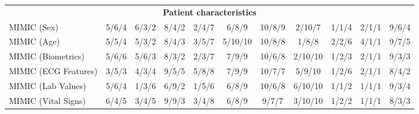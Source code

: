 \documentclass{article}
\begin{document}
\begin{table}[htbp]
\begin{tabular}{lcccccccccc}
                    \multicolumn{11}{c}{\textbf{Patient characteristics }} \\
                    MIMIC (Sex) & 5/6/4 & 6/3/2  & 8/4/2  & 2/4/7  & 6/8/9  & 10/8/9  & 2/10/7  & 1/1/4  & 2/1/1  & 9/6/4  \\
                    MIMIC (Age) & 5/5/4 & 5/3/2  & 8/4/3  & 3/5/7  & 5/10/10  & 10/8/8  & 1/8/8  & 2/2/6  & 4/1/1  & 9/7/5  \\
                    MIMIC (Biometrics) & 5/6/6 & 5/6/3  & 8/3/2  & 2/3/7  & 7/9/9  & 10/6/8  & 2/10/10  & 1/2/3  & 2/1/1  & 9/3/3 \\
                    MIMIC (ECG Features) & 3/5/3 & 4/3/4  & 9/5/5  & 5/8/8  & 7/9/9  & 10/7/7  & 5/9/10  & 1/2/6  & 2/1/1  & 8/4/2  \\
                    MIMIC (Lab Values) & 5/6/4 & 1/3/6  & 6/9/2  & 1/5/6  & 6/8/9  & 10/6/8  & 6/10/10  & 1/1/2  & 1/1/1  & 9/3/4  \\
                    MIMIC (Vital Signs) & 6/4/5 & 3/4/5  & 9/9/3  & 3/4/8  & 6/8/9  & 9/7/7  & 3/10/10  & 1/2/2  & 1/1/1  & 8/3/3  \\
                    
                    \bottomrule
                \end{tabular}
            \end{table}
\end{document}
